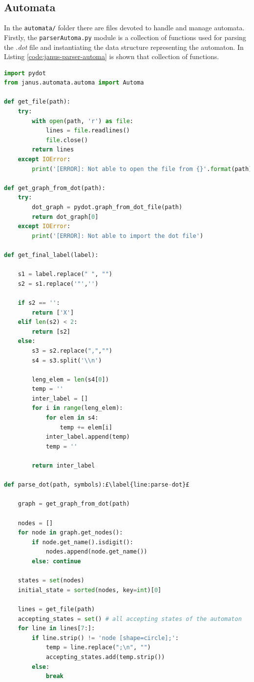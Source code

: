 \subsection{Automata}
In the \texttt{automata/} folder there are files devoted to handle and manage automata. Firstly, the \texttt{parserAutoma.py} module is a collection of functions used for parsing the \textit{.dot} file and instantiating the data structure representing the automaton. In Listing \ref{code:janus-parser-automa} is shown that collection of functions.
\begin{lstlisting}[language=Python, style=Python, escapechar = £, label={code:janus-parser-automa}, caption={The \texttt{parserAutoma.py} module}]
import pydot
from janus.automata.automa import Automa

def get_file(path):
    try:
        with open(path, 'r') as file:
            lines = file.readlines()
            file.close()
        return lines
    except IOError:
        print('[ERROR]: Not able to open the file from {}'.format(path))

def get_graph_from_dot(path):
    try:
        dot_graph = pydot.graph_from_dot_file(path)
        return dot_graph[0]
    except IOError:
        print('[ERROR]: Not able to import the dot file')

def get_final_label(label):

    s1 = label.replace(" ", "")
    s2 = s1.replace('"','')

    if s2 == '':
        return ['X']
    elif len(s2) < 2:
        return [s2]
    else:
        s3 = s2.replace(",","")
        s4 = s3.split('\\n')

        leng_elem = len(s4[0])
        temp = ''
        inter_label = []
        for i in range(leng_elem):
            for elem in s4:
                temp += elem[i]
            inter_label.append(temp)
            temp = ''

        return inter_label

def parse_dot(path, symbols):£\label{line:parse-dot}£

    graph = get_graph_from_dot(path)

    nodes = []
    for node in graph.get_nodes():
        if node.get_name().isdigit():
            nodes.append(node.get_name())
        else: continue

    states = set(nodes)
    initial_state = sorted(nodes, key=int)[0]

    lines = get_file(path)
    accepting_states = set() # all accepting states of the automaton
    for line in lines[7:]:
        if line.strip() != 'node [shape=circle];':
            temp = line.replace(";\n", "")
            accepting_states.add(temp.strip())
        else:
            break


\end{lstlisting}
